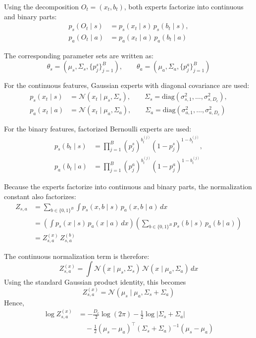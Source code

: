 Using the decomposition \(O_t=(x_t,b_t)\), both experts factorize into continuous and binary parts:
\begin{align}
p_s(O_t \mid s)
&=
p_s(x_t \mid s)\,p_s(b_t \mid s),
\\
p_a(O_t \mid a)
&=
p_a(x_t \mid a)\,p_a(b_t \mid a)
\end{align}

The corresponding parameter sets are written as:
\begin{equation}
\theta_s=(\mu_s,\Sigma_s,\{p_j^s\}_{j=1}^{B}),
\qquad
\theta_a=(\mu_a,\Sigma_a,\{p_j^a\}_{j=1}^{B})
\end{equation}

For the continuous features, Gaussian experts with diagonal covariance are used:
\begin{align}
p_s(x_t \mid s)
&=
\mathcal{N}(x_t \mid \mu_s,\Sigma_s),
\qquad
\Sigma_s=\mathrm{diag}\!\left(\sigma^2_{s,1},\dots,\sigma^2_{s,D_c}\right),
\\
p_a(x_t \mid a)
&=
\mathcal{N}(x_t \mid \mu_a,\Sigma_a),
\qquad
\Sigma_a=\mathrm{diag}\!\left(\sigma^2_{a,1},\dots,\sigma^2_{a,D_c}\right)
\end{align}

For the binary features, factorized Bernoulli experts are used:
\begin{align}
p_s(b_t \mid s)
&=
\prod_{j=1}^{B}
(p_j^s)^{b_t^{(j)}}(1-p_j^s)^{1-b_t^{(j)}},
\\
p_a(b_t \mid a)
&=
\prod_{j=1}^{B}
(p_j^a)^{b_t^{(j)}}(1-p_j^a)^{1-b_t^{(j)}}
\end{align}

Because the experts factorize into continuous and binary parts, the normalization constant also factorizes:
\begin{align}
Z_{s,a}
&=
\sum_{b \in \{0,1\}^{B}}
\int
p_s(x,b \mid s)\,p_a(x,b \mid a)\,dx
\nonumber\\
&=
\left(
\int p_s(x \mid s)\,p_a(x \mid a)\,dx
\right)
\left(
\sum_{b \in \{0,1\}^{B}}
p_s(b \mid s)\,p_a(b \mid a)
\right)
\nonumber\\
&=
Z_{s,a}^{(x)}\,Z_{s,a}^{(b)}
\end{align}

The continuous normalization term is therefore:
\begin{equation}
Z_{s,a}^{(x)}
=
\int
\mathcal{N}(x \mid \mu_s,\Sigma_s)\,
\mathcal{N}(x \mid \mu_a,\Sigma_a)\,dx
\end{equation}
Using the standard Gaussian product identity, this becomes
\begin{equation}
Z_{s,a}^{(x)}
=
\mathcal{N}(\mu_s \mid \mu_a,\Sigma_s+\Sigma_a)
\label{eq:poe_zx_closed}
\end{equation}
Hence,
\begin{align}
\log Z_{s,a}^{(x)}
&=
-\frac{D_c}{2}\log(2\pi)
-\frac{1}{2}\log |\Sigma_s+\Sigma_a|
\nonumber\\
&\quad
-\frac{1}{2}
(\mu_s-\mu_a)^\top
(\Sigma_s+\Sigma_a)^{-1}
(\mu_s-\mu_a)
\end{align}

